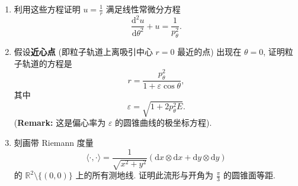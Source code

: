 \begin{RiemannExercise}
\begin{enumerate}[label=(\arabic*),ref=\arabic*,leftmargin=*]
\begin{enumerate}[label=(\alph*),leftmargin=*]
\begin{align*}
\end{align*}
其中 $E$ 和 $p_\theta$ 是积分常数.
\item 利用这些方程证明 $u=\frac1r$ 满足线性常微分方程
\[
  \frac{\mathrm{d}^2u}{\mathrm{d}\theta^2}+u=\frac1{p_\theta^2}.
\]
\item 假设\textbf{近心点} (即粒子轨道上离吸引中心 $r=0$ 最近的点) 出现在 $\theta=0$, 证明粒子轨道的方程是
\[
  r=\frac{p_\theta^2}{1+\varepsilon\cos\theta},
\]
其中
\[
  \varepsilon=\sqrt{1+2p_\theta^2E}.
\]
{\small (\textbf{Remark:} 这是偏心率为 $\varepsilon$ 的圆锥曲线的极坐标方程).}
\item 刻画带 Riemann 度量
\[
  \langle\cdot,\cdot\rangle=\frac1{\sqrt{x^2+y^2}}(\mathrm{d}x\otimes\mathrm{d}x+\mathrm{d}y\otimes\mathrm{d}y)
\]
的 $\mathbb{R}^2\setminus\{(0,0)\}$ 上的所有测地线. 证明此流形与开角为 $\frac\pi3$ 的圆锥面等距.
\end{enumerate}
\end{enumerate}
\end{RiemannExercise}
